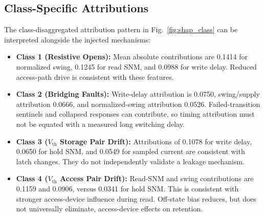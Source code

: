 \documentclass[conference]{IEEEtran}
\begin{document}
\begin{table}[t]
\centering
\caption{Top Features by Mean Absolute SHAP Value (1,350 Simulated Observations)}
\label{tab:shap_vals}
\end{table}

\subsection{Class-Specific Attributions}
The class-disaggregated attribution pattern in Fig.~\ref{fig:shap_class} can be interpreted alongside the injected mechanisms:
\begin{itemize}
    \item \textbf{Class 1 (Resistive Opens):} Mean absolute contributions are 0.1414 for normalized swing, 0.1245 for read SNM, and 0.0988 for write delay. Reduced access-path drive is consistent with these features.
    \item \textbf{Class 2 (Bridging Faults):} Write-delay attribution is 0.0750, swing/supply attribution 0.0666, and normalized-swing attribution 0.0526. Failed-transition sentinels and collapsed responses can contribute, so timing attribution must not be equated with a measured long switching delay.
    \item \textbf{Class 3 ($V_{\text{th}}$ Storage Pair Drift):} Attributions of 0.1078 for write delay, 0.0650 for hold SNM, and 0.0549 for sampled current are consistent with latch changes. They do not independently validate a leakage mechanism.
    \item \textbf{Class 4 ($V_{\text{th}}$ Access Pair Drift):} Read-SNM and swing contributions are 0.1159 and 0.0906, versus 0.0341 for hold SNM. This is consistent with stronger access-device influence during read. Off-state bias reduces, but does not universally eliminate, access-device effects on retention.
\end{itemize}
\end{document}
